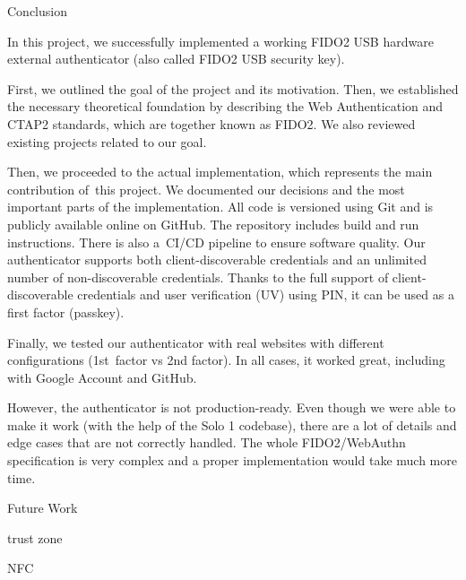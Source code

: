\chap[conclusion] Conclusion

In this project, {\sbf we successfully implemented} a working FIDO2 USB hardware external authenticator (also called FIDO2 USB security key).

First, we outlined the goal of the project and its motivation. Then, we established the necessary theoretical foundation by describing the Web Authentication and CTAP2 standards, which are together known as FIDO2. We also reviewed existing projects related to our goal.

Then, we proceeded to the actual implementation, which represents the main contribution of~this project. We documented our decisions and the most important parts of the implementation. All code is versioned using Git and is publicly {\sbf available online on GitHub}. The repository includes build and run instructions. There is also a~CI/CD pipeline to ensure software quality. Our authenticator supports both client-discoverable credentials and an unlimited number of non-discoverable credentials. Thanks to the full support of client-discoverable credentials and user verification (UV) using PIN, it can be used as a first factor (passkey).

Finally, {\sbf we tested} our authenticator {\sbf with real websites} with different configurations (1st~factor vs 2nd factor). In all cases, {\sbf it worked great}, including with Google Account and GitHub.

However, the authenticator is not production-ready. Even though we were able to make it work (with the help of the Solo 1 codebase), there are a lot of details and edge cases that are not correctly handled. The whole FIDO2/WebAuthn specification is very complex and a proper implementation would take much more time.


\sec Future Work

trust zone

NFC
